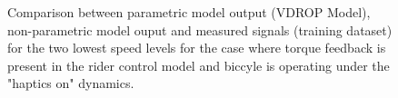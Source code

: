  \begin{figure}[!h]
    \centering
    \begin{subfigure}[b]{\textwidth}
        \centering
        \caption{}
        \label{fig:ropm_fit1}
    \end{subfigure}
    \begin{subfigure}[b]{\textwidth}
        \centering
        \caption{}
        \label{fig:ropm_fit2}
    \end{subfigure}
    
    \caption{Comparison between parametric model output (VDROP Model), non-parametric model ouput and measured signals (training dataset) for the two lowest speed levels for the case where torque feedback is present in the rider control model and biccyle is operating under the "haptics on" dynamics.}
    \label{fig:ropm_fitA}
 \end{figure}

